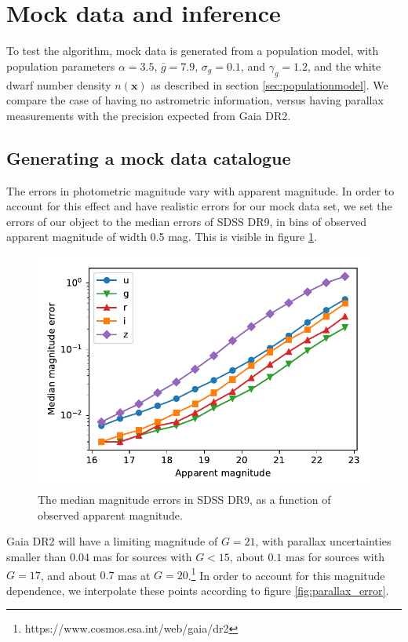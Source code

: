 \documentclass[fleqn,usenatbib]{mnras}
\begin{document}
\section{Mock data and inference}\label{sec:mock}

To test the algorithm, mock data is generated from a population model, with population parameters $\alpha=3.5$, $\bar{g}=7.9$, $\sigma_g=0.1$, and $\gamma_g=1.2$, and the white dwarf number density $n(\mathbf{x})$ as described in section \ref{sec:populationmodel}. We compare the case of having no astrometric information, versus having parallax measurements with the precision expected from Gaia DR2.

\subsection{Generating a mock data catalogue}

The errors in photometric magnitude vary with apparent magnitude. In order to account for this effect and have realistic errors for our mock data set, we set the errors of our object to the median errors of SDSS DR9, in bins of observed apparent magnitude of width 0.5 mag. This is visible in figure \ref{fig:magnitude_error}.

\begin{figure}
	\includegraphics[width=\columnwidth]{median_app_errors.pdf}
    \caption{The median magnitude errors in SDSS DR9, as a function of observed apparent magnitude.}
    \label{fig:magnitude_error}
\end{figure}

Gaia DR2 will have a limiting magnitude of $G=21$, with parallax uncertainties smaller than $0.04$ mas for sources with $G<15$, about $0.1$ mas for sources with $G=17$, and about $0.7$ mas at $G=20$.\footnote{https://www.cosmos.esa.int/web/gaia/dr2} In order to account for this magnitude dependence, we interpolate these points according to figure \ref{fig:parallax_error}.
\end{document}
